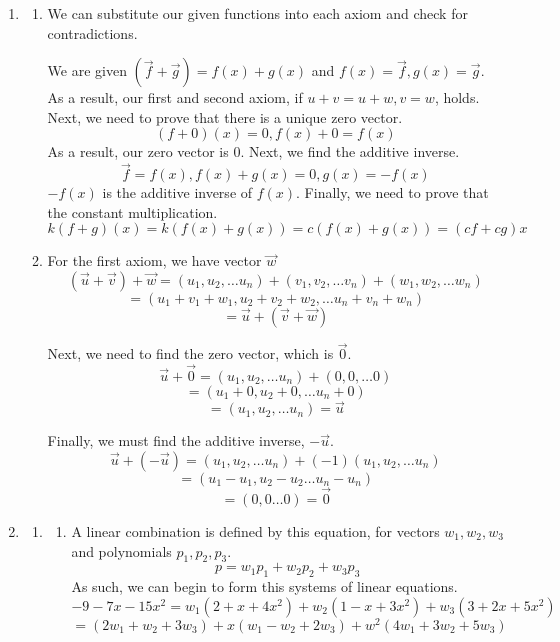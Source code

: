 \documentclass[11pt, letterpaper, twoside]{article}
\begin{document}
\begin{enumerate}
\item 
\begin{enumerate}[label=\alph*)]
\item We can substitute our given functions into each axiom and check for contradictions.

We are given \((\vec f + \vec g)=f(x)+g(x)\) and \(f(x)=\vec f, g(x)=\vec g\). As a result, our first and second axiom, if \(u+v=u+w,v=w\), holds.
Next, we need to prove that there is a unique zero vector.
\[(f+0)(x)=0, f(x)+0=f(x)\]
As a result, our zero vector is 0.
Next, we find the additive inverse.
\[\vec f = f(x), f(x)+g(x)=0, g(x)=-f(x)\]
\(-f(x)\) is the additive inverse of \(f(x)\).
Finally, we need to prove that the constant multiplication.
\[k(f+g)(x)=k(f(x)+g(x))=c(f(x)+g(x))=(cf+cg)x\]

\item For the first axiom, we have vector \(\vec w\)
\[(\vec u + \vec v)+\vec w=(u_1,u_2,\dots u_n)+(v_1, v_2, \dots v_n)+(w_1, w_2, \dots w_n)\]
\[=(u_1+v_1+w_1, u_2+v_2+w_2, \dots u_n+v_n+w_n)\]
\[=\vec u + (\vec v+\vec w)\]

Next, we need to find the zero vector, which is \(\vec 0\).
\[\vec u + \vec 0 = (u_1, u_2, \dots u_n)+(0,0,\dots 0)\]
\[=(u_1+0, u_2+0, \dots u_n+0)\]
\[=(u_1, u_2, \dots u_n)=\vec u\]

Finally, we must find the additive inverse, \(-\vec u\). 
\[\vec u+(-\vec u)=(u_1, u_2, \dots u_n)+(-1)(u_1, u_2, \dots u_n)\]
\[=(u_1-u_1, u_2-u_2 \dots u_n-u_n)\]
\[=(0,0 \dots 0)=\vec {0}\]
\end{enumerate}
\item 
\begin{enumerate}[label=\alph*)]
\item \begin{enumerate}[label=\roman*)]
\item A linear combination is defined by this equation, for vectors \(w_1, w_2, w_3\) and polynomials \(p_1, p_2, p_3\).
\[p=w_1p_1+w_2p_2+w_3p_3\]
As such, we can begin to form this systems of linear equations.
\[-9-7x-15x^2=w_1(2+x+4x^2)+w_2(1-x+3x^2)+w_3(3+2x+5x^2)\]
\[=(2w_1+w_2+3w_3)+x(w_1-w_2+2w_3)+w^2(4w_1+3w_2+5w_3)\]


\end{enumerate}
\end{enumerate}
\end{enumerate}
\end{document}

